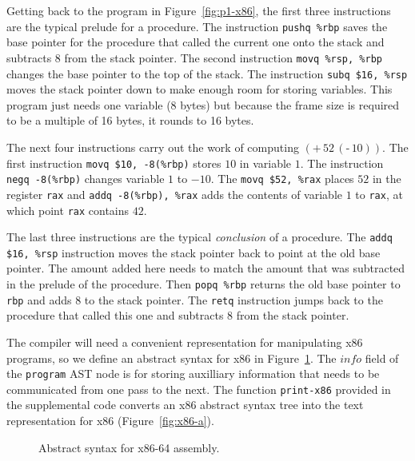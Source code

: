 \documentclass[12pt]{book}
\newcommand{\itm}[1]{\ensuremath{\mathit{#1}}}
\newcommand{\Instr}{\itm{instr}}
\newcommand{\Prog}{\itm{prog}}
\newcommand{\Arg}{\itm{arg}}
\newcommand{\Int}{\itm{int}}
\newcommand{\key}[1]{\texttt{#1}}
\newcommand{\UNIOP}[2]{(\key{#1}\,#2)}
\newcommand{\BINOP}[3]{(\key{#1}\,#2\,#3)}
\newcommand{\INT}[1]{(\key{int}\;#1)}
\newcommand{\REG}[1]{(\key{reg}\;#1)}
\newcommand{\STACKLOC}[1]{(\key{stack}\;#1)}
\begin{document}
Getting back to the program in Figure~\ref{fig:p1-x86}, the first
three instructions are the typical prelude for a procedure.  The
instruction \key{pushq \%rbp} saves the base pointer for the procedure
that called the current one onto the stack and subtracts $8$ from the
stack pointer. The second instruction \key{movq \%rsp, \%rbp} changes
the base pointer to the top of the stack. The instruction \key{subq
  \$16, \%rsp} moves the stack pointer down to make enough room for
storing variables.  This program just needs one variable ($8$ bytes)
but because the frame size is required to be a multiple of 16 bytes,
it rounds to 16 bytes.

The next four instructions carry out the work of computing
$\BINOP{+}{52}{\UNIOP{-}{10} }$. The first instruction \key{movq \$10,
  -8(\%rbp)} stores $10$ in variable $1$. The instruction \key{negq
  -8(\%rbp)} changes variable $1$ to $-10$. The \key{movq \$52, \%rax}
places $52$ in the register \key{rax} and \key{addq -8(\%rbp), \%rax}
adds the contents of variable $1$ to \key{rax}, at which point
\key{rax} contains $42$.

The last three instructions are the typical \emph{conclusion} of a
procedure.  The \key{addq \$16, \%rsp} instruction moves the stack
pointer back to point at the old base pointer. The amount added here
needs to match the amount that was subtracted in the prelude of the
procedure.  Then \key{popq \%rbp} returns the old base pointer to
\key{rbp} and adds $8$ to the stack pointer.  The \key{retq}
instruction jumps back to the procedure that called this one and
subtracts 8 from the stack pointer.

The compiler will need a convenient representation for manipulating
x86 programs, so we define an abstract syntax for x86 in
Figure~\ref{fig:x86-ast-a}. The \itm{info} field of the \key{program}
AST node is for storing auxilliary information that needs to be
communicated from one pass to the next. The function \key{print-x86}
provided in the supplemental code converts an x86 abstract syntax tree
into the text representation for x86 (Figure~\ref{fig:x86-a}).

\begin{figure}[tbp]
\fbox{
\begin{minipage}{0.96\textwidth}
\[
\begin{array}{lcl}
\Arg &::=&  \INT{\Int} \mid \REG{\itm{register}}
    \mid \STACKLOC{\Int} \\ 
\Instr &::=& (\key{add} \; \Arg\; \Arg) \mid 
      (\key{sub} \; \Arg\; \Arg) \mid 
      (\key{imul} \; \Arg\;\Arg) \mid 
      (\key{neg} \; \Arg) \mid \\
  && (\key{mov} \; \Arg\; \Arg) \mid 
      (\key{call} \; \mathit{label}) \mid
      (\key{push}\;\Arg) \mid (\key{pop}\;\Arg) \mid (\key{ret}) \\
\Prog &::= & (\key{program} \;\itm{info} \; \Instr^{+})
\end{array}
\]
\end{minipage}
}
\caption{Abstract syntax for x86-64 assembly.}
\label{fig:x86-ast-a}
\end{figure}
\end{document}
